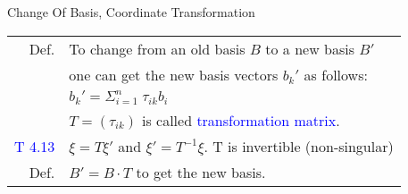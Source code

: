 \begin{mainbox}{Change Of Basis, Coordinate Transformation}
\setlength{\tabcolsep}{2pt}
\begin{tabular}{rl}
	Def. & To change from an old basis $B$ to a new basis $B'$\\
	& one can get the new basis vectors $b_k'$ as follows:\\
	& $b_k' = \Sigma_{i=1}^n\;\tau_{ik}b_i$\\
	& $T = (\tau_{ik})$ is called \textcolor{blue}{transformation matrix}.\\
	\rule{0pt}{3ex}
	\textcolor{blue}{T 4.13} & $\xi = T\xi'$ and $\xi' = T^{-1}\xi$. T is invertible (non-singular)\\
	\rule{0pt}{3ex}
	Def. & $B' = B\cdot T$ to get the new basis.\\
\end{tabular}
\end{mainbox}